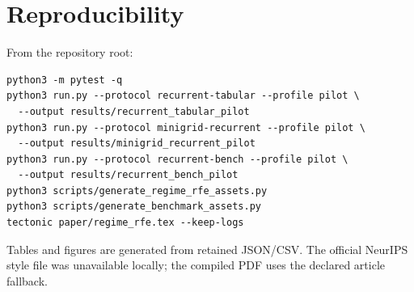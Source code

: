 \documentclass[11pt]{article}
\begin{document}
\section{Reproducibility}
\label{app:repro}
From the repository root:
\begin{verbatim}
python3 -m pytest -q
python3 run.py --protocol recurrent-tabular --profile pilot \
  --output results/recurrent_tabular_pilot
python3 run.py --protocol minigrid-recurrent --profile pilot \
  --output results/minigrid_recurrent_pilot
python3 run.py --protocol recurrent-bench --profile pilot \
  --output results/recurrent_bench_pilot
python3 scripts/generate_regime_rfe_assets.py
python3 scripts/generate_benchmark_assets.py
tectonic paper/regime_rfe.tex --keep-logs
\end{verbatim}
Tables and figures are generated from retained JSON/CSV. The official NeurIPS
style file was unavailable locally; the compiled PDF uses the declared article
fallback.



\end{document}
